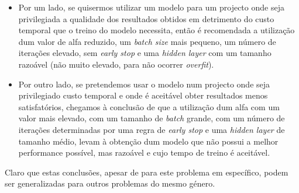 \begin{itemize}
\item Por um lado, se quisermos utilizar um modelo para um projecto onde seja privilegiada a qualidade dos resultados obtidos em detrimento do custo temporal que o treino do modelo necessita, então é recomendada a utilização dum valor de alfa reduzido, um \textit{batch size} mais pequeno, um número de iterações elevado, sem \textit{early stop} e uma \textit{hidden layer} com um tamanho razoável (não muito elevado, para não ocorrer \textit{overfit}).
\item Por outro lado, se pretendemos usar o modelo num projecto onde seja privilegiado custo temporal e onde é aceitável obter resultados menos satisfatórios, chegamos à conclusão de que a utilização dum alfa com um valor mais elevado, com um tamanho de \textit{batch} grande, com um número de iterações determinadas por uma regra de \textit{early stop} e uma \textit{hidden layer} de tamanho médio, levam à obtenção dum modelo que não possui a melhor performance possível, mas razoável e cujo tempo de treino é aceitável.
\end{itemize}
Claro que estas conclusões, apesar de para este problema em específico, podem ser generalizadas para outros problemas do mesmo género.

